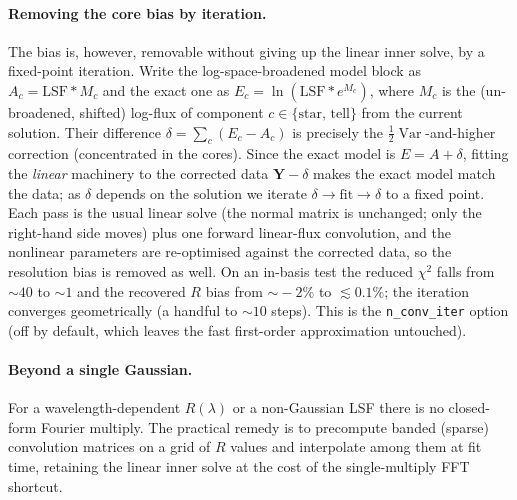 \documentclass[11pt]{article}
\newcommand{\Var}{\operatorname{Var}}
\begin{document}
\paragraph{Removing the core bias by iteration.}
The bias is, however, removable without giving up the linear inner solve, by a
fixed-point iteration. Write the log-space-broadened model block as $A_c =
\mathrm{LSF}\!*\!M_c$ and the exact one as $E_c = \ln(\mathrm{LSF}\!*\!e^{M_c})$,
where $M_c$ is the (un-broadened, shifted) log-flux of component $c\in\{\text{star,
tell}\}$ from the current solution. Their difference $\delta = \sum_c (E_c - A_c)$
is precisely the $\tfrac12\Var$-and-higher correction (concentrated in the cores).
Since the exact model is $E = A + \delta$, fitting the \emph{linear} machinery to
the corrected data $\mathbf{Y} - \delta$ makes the exact model match the data; as
$\delta$ depends on the solution we iterate $\delta\!\to\!\text{fit}\!\to\!\delta$
to a fixed point. Each pass is the usual linear solve (the normal matrix is
unchanged; only the right-hand side moves) plus one forward linear-flux
convolution, and the nonlinear parameters are re-optimised against the corrected
data, so the resolution bias is removed as well. On an in-basis test the reduced
$\chi^2$ falls from $\sim\!40$ to $\sim\!1$ and the recovered $R$ bias from
$\sim\!-2\%$ to $\lesssim 0.1\%$; the iteration converges geometrically (a handful
to $\sim\!10$ steps). This is the \texttt{n\_conv\_iter} option (off by default,
which leaves the fast first-order approximation untouched).

\paragraph{Beyond a single Gaussian.}
For a wavelength-dependent $R(\lambda)$ or a non-Gaussian LSF there is no
closed-form Fourier multiply. The practical remedy is to precompute banded
(sparse) convolution matrices on a grid of $R$ values and interpolate among them
at fit time, retaining the linear inner solve at the cost of the single-multiply
FFT shortcut.

\end{document}
